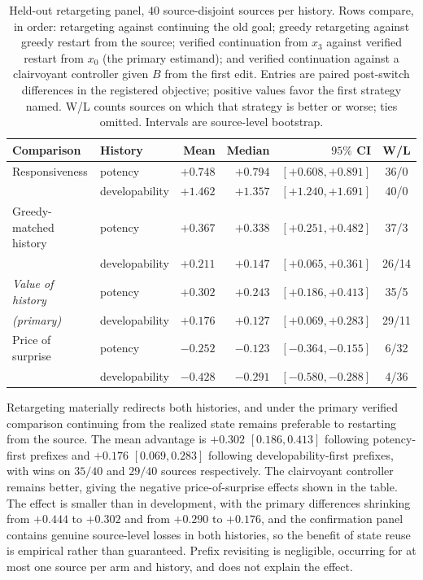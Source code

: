 \documentclass{article}
\theoremstyle{definition}
\theoremstyle{remark}
\begin{document}
\begin{table}[h]
\centering
{\small\setlength{\tabcolsep}{4pt}
\begin{tabular}{llrrrc}
\toprule
Comparison & History & Mean & Median & $95\%$ CI & W/L \\
\midrule
Responsiveness & potency & $+0.748$ & $+0.794$ & $[+0.608,+0.891]$ & 36/0 \\
 & developability & $+1.462$ & $+1.357$ & $[+1.240,+1.691]$ & 40/0 \\[2pt]
Greedy-matched history & potency & $+0.367$ & $+0.338$ & $[+0.251,+0.482]$ & 37/3 \\
 & developability & $+0.211$ & $+0.147$ & $[+0.065,+0.361]$ & 26/14 \\[2pt]
\emph{Value of history} & potency & $+0.302$ & $+0.243$ & $[+0.186,+0.413]$ & 35/5 \\
\emph{(primary)} & developability & $+0.176$ & $+0.127$ & $[+0.069,+0.283]$ & 29/11 \\[2pt]
Price of surprise & potency & $-0.252$ & $-0.123$ & $[-0.364,-0.155]$ & 6/32 \\
 & developability & $-0.428$ & $-0.291$ & $[-0.580,-0.288]$ & 4/36 \\
\bottomrule
\end{tabular}}
\caption{\small Held-out retargeting panel, $40$ source-disjoint sources per history. Rows compare, in order: retargeting against continuing the old goal; greedy retargeting against greedy restart from the source; verified continuation from $x_3$ against verified restart from $x_0$ (the primary estimand); and verified continuation against a clairvoyant controller given $B$ from the first edit. Entries are paired post-switch differences in the registered objective; positive values favor the first strategy named. W/L counts sources on which that strategy is better or worse; ties omitted. Intervals are source-level bootstrap.}
\label{tab:retarget-full}
\end{table}

Retargeting materially redirects both histories, and under the primary verified comparison continuing from the realized state remains preferable to restarting from the source. The mean advantage is $+0.302$ $[0.186,0.413]$ following potency-first prefixes and $+0.176$ $[0.069,0.283]$ following developability-first prefixes, with wins on $35/40$ and $29/40$ sources respectively. The clairvoyant controller remains better, giving the negative price-of-surprise effects shown in the table. The effect is smaller than in development, with the primary differences shrinking from $+0.444$ to $+0.302$ and from $+0.290$ to $+0.176$, and the confirmation panel contains genuine source-level losses in both histories, so the benefit of state reuse is empirical rather than guaranteed. Prefix revisiting is negligible, occurring for at most one source per arm and history, and does not explain the effect.
\end{document}
